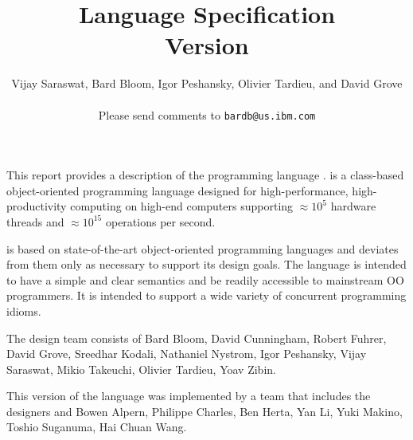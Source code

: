 
\thispagestyle{empty}


\title{ \Xten Language Specification \\
\large Version \integerversion}
\author{Vijay Saraswat, Bard Bloom, Igor Peshansky, Olivier Tardieu, and David Grove\\
\\
Please send comments to 
\texttt{bardb@us.ibm.com}}

\maketitle

\newcommand\authorsc[1]{#1}

This report provides a description of the programming
language \Xten. \Xten{} is a class-based object-oriented
programming language designed for high-performance, high-productivity
computing on high-end computers supporting $\approx 10^5$ hardware threads
and $\approx 10^{15}$ operations per second. 

\Xten{} is based on state-of-the-art object-oriented programming
languages and deviates from them only as necessary to support its
design goals. The language is intended to have a simple and clear
semantics and be readily accessible to mainstream OO programmers. It
is intended to support a wide variety of concurrent programming
idioms.


The \Xten{} design team consists of
\authorsc{Bard Bloom}, 
\authorsc{David Cunningham},
\authorsc{Robert Fuhrer},
\authorsc{David Grove},
\authorsc{Sreedhar Kodali}, 
\authorsc{Nathaniel Nystrom},
\authorsc{Igor Peshansky}, 
\authorsc{Vijay Saraswat},
\authorsc{Mikio Takeuchi},
\authorsc{Olivier Tardieu},
\authorsc{Yoav Zibin}.

This version of the language was implemented by a team that includes
the designers and 
\authorsc{Bowen Alpern}, 
\authorsc{Philippe Charles}, 
\authorsc{Ben Herta}, 
\authorsc{Yan Li}, 
\authorsc{Yuki Makino}, 
\authorsc{Toshio Suganuma}, 
\authorsc{Hai Chuan Wang}. 


